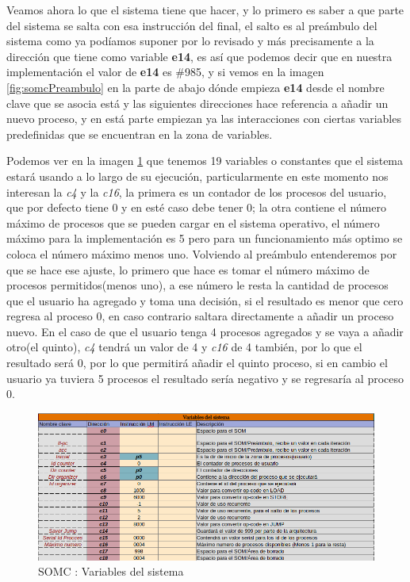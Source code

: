 \documentclass[letterpaper,12pt,oneside]{book}
\begin{document}
			
			Veamos ahora lo que el sistema tiene que hacer, y lo primero es saber a que parte del sistema se salta con esa instrucción del final, el
			salto es al preámbulo del sistema como ya podíamos suponer por lo revisado y más precisamente a la dirección que tiene como variable
			\textbf{e14}, es así que podemos decir que en nuestra implementación el valor de \textbf{e14} es \#985, y si vemos en la imagen
			\ref{fig:somcPreambulo} en la parte de abajo dónde empieza \textbf{e14} desde el nombre clave que se asocia está y las siguientes
			direcciones hace referencia a añadir un nuevo proceso, y en está parte empiezan ya las interacciones con ciertas variables predefinidas
			que se encuentran en la zona de variables.
			
			Podemos ver en la imagen \ref{fig:somcVariablesSis} que tenemos 19 variables o constantes que el sistema estará usando a lo largo
			de su ejecución, particularmente en este momento nos interesan la \textit{c4} y la \textit{c16}, la primera es un contador de los 
			procesos del usuario, que por defecto tiene 0 y en esté caso debe tener 0; la otra contiene el número máximo
			de procesos que se pueden cargar en el sistema operativo, el número máximo para la implementación es 5 pero para un funcionamiento
			más optimo se coloca el número máximo menos uno. Volviendo al preámbulo entenderemos por que se hace ese ajuste, lo primero que hace
			es tomar el número máximo de procesos permitidos(menos uno), a ese número le resta la cantidad
			de procesos que el usuario ha agregado y toma una decisión, si el resultado es menor que cero regresa al proceso 0, en caso
			contrario saltara directamente a añadir un proceso nuevo. En el caso de que el usuario tenga 4 procesos agregados y se vaya a añadir otro(el quinto),
			\textit{c4} tendrá un valor de 4 y \textit{c16} de 4 también, por lo que el resultado será 0, por lo que permitirá añadir el quinto proceso, si en
			cambio el usuario ya tuviera 5 procesos el resultado sería negativo y se regresaría al proceso 0.
			
						
			
			\begin{figure}[h]		
			\centering
			\includegraphics[scale=0.56]{media/CARDIACC/VariablesDelSistema.png}
			\caption{SOMC : Variables del sistema}
			\label{fig:somcVariablesSis}
		\end{figure}
		
\end{document}
